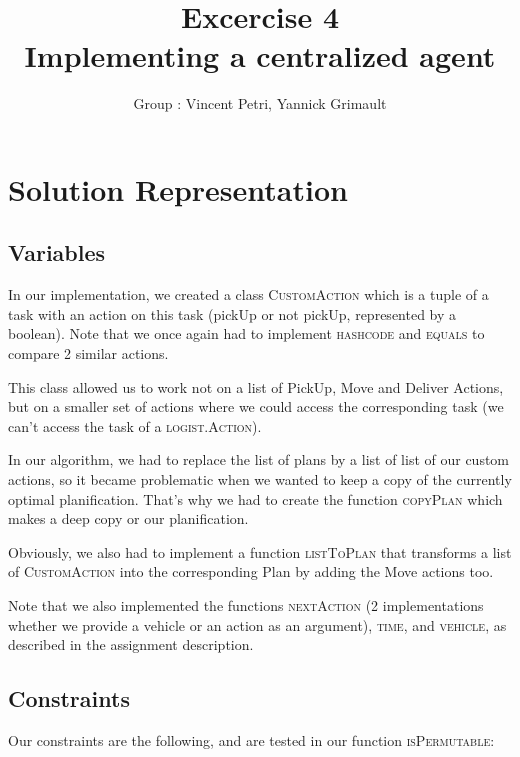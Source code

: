 \documentclass[11pt]{article}
\title{\bf Excercise 4\\ Implementing a centralized agent}
\author{Group \textnumero 3 : Vincent Petri, Yannick Grimault}
\begin{document}
\maketitle

\section{Solution Representation}

\subsection{Variables}
In our implementation, we created a class \textsc{CustomAction} which is a tuple of a task with an action on this task (pickUp or not pickUp, represented by a boolean). Note that we once again had to implement \textsc{hashcode} and \textsc{equals} to compare 2 similar actions.

This class allowed us to work not on a list of PickUp, Move and Deliver Actions, but on a smaller set of actions where we could access the corresponding task (we can't access the task of a \textsc{logist.Action}).

\vspace{5mm}

In our algorithm, we had to replace the list of plans by a list of list of our custom actions, so it became problematic when we wanted to keep a copy of the currently optimal planification. That's why we had to create the function \textsc{copyPlan} which makes a deep copy or our planification.

Obviously, we also had to implement a function \textsc{listToPlan} that transforms a list of \textsc{CustomAction} into the corresponding Plan by adding the Move actions too.

\vspace{5mm}

Note that we also implemented the functions \textsc{nextAction} (2 implementations whether we provide a vehicle or an action as an argument), \textsc{time}, and \textsc{vehicle}, as described in the assignment description.

\subsection{Constraints}
Our constraints are the following, and are tested in our function \textsc{isPermutable}:
\end{document}
